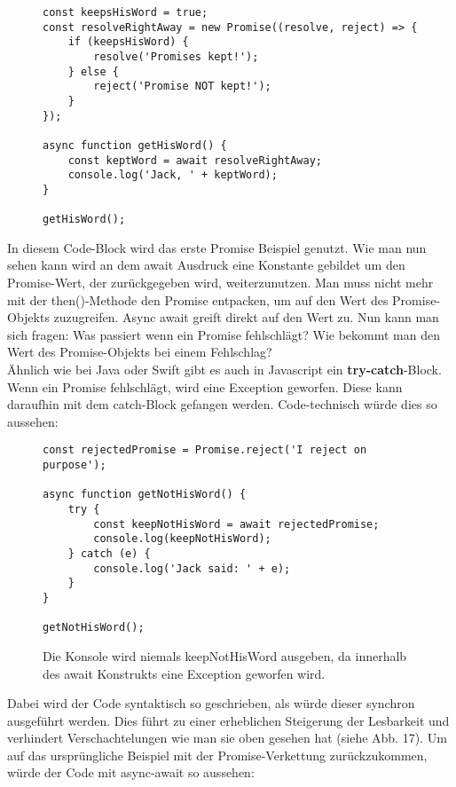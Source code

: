 \begin{figure}[H]
\begin{lstlisting}[basicstyle=\small]
const keepsHisWord = true;
const resolveRightAway = new Promise((resolve, reject) => {
    if (keepsHisWord) {
        resolve('Promises kept!');
    } else {
        reject('Promise NOT kept!');
    }
});

async function getHisWord() {
    const keptWord = await resolveRightAway;
    console.log('Jack, ' + keptWord);
}

getHisWord();
\end{lstlisting}
\end{figure}

\noindent
In diesem Code-Block wird das erste Promise Beispiel genutzt. Wie man nun sehen kann wird an dem await Ausdruck eine Konstante gebildet um den Promise-Wert, der zurückgegeben wird, weiterzunutzen. Man muss nicht mehr mit der then()-Methode den Promise entpacken, um auf den Wert des Promise-Objekts zuzugreifen. Async await greift direkt auf den Wert zu. Nun kann man sich fragen: Was passiert wenn ein Promise fehlschlägt? Wie bekommt man den Wert des Promise-Objekts bei einem Fehlschlag? \\

\noindent
Ähnlich wie bei Java oder Swift gibt es auch in Javascript ein \textbf{try-catch}-Block. Wenn ein Promise fehlschlägt, wird eine Exception geworfen.\cite{async-await-heise} Diese kann daraufhin mit dem catch-Block gefangen werden. Code-technisch würde dies so aussehen:

\begin{figure}[H]
\begin{lstlisting}[basicstyle=\small]
const rejectedPromise = Promise.reject('I reject on purpose');

async function getNotHisWord() {
    try {
        const keepNotHisWord = await rejectedPromise;
        console.log(keepNotHisWord);
    } catch (e) {
        console.log('Jack said: ' + e);
    }
}

getNotHisWord();
\end{lstlisting}
\caption{Die Konsole wird niemals keepNotHisWord ausgeben, da innerhalb des await Konstrukts eine Exception geworfen wird.}
\end{figure}

\noindent
Dabei wird der Code syntaktisch so geschrieben, als würde dieser synchron ausgeführt werden. Dies führt zu einer erheblichen Steigerung der Lesbarkeit und verhindert Verschachtelungen wie man sie oben gesehen hat (siehe Abb. 17). Um auf das ursprüngliche Beispiel mit der Promise-Verkettung zurückzukommen, würde der Code mit async-await so aussehen:\\

